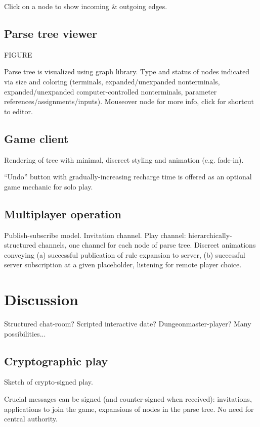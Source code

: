 \documentclass{acm_proc_article-sp}
\begin{document}
Click on a node to show incoming \& outgoing edges.

\subsection{Parse tree viewer}

FIGURE

Parse tree is visualized using graph library.
Type and status of nodes indicated via size and coloring (terminals, expanded/unexpanded nonterminals, expanded/unexpanded computer-controlled nonterminals, parameter references/assignments/inputs).
Mouseover node for more info, click for shortcut to editor.

\subsection{Game client}

Rendering of tree with minimal, discreet styling and animation (e.g. fade-in).

``Undo'' button with gradually-increasing recharge time is offered as an optional game mechanic for solo play.

\subsection{Multiplayer operation}

Publish-subscribe model.
Invitation channel.
Play channel: hierarchically-structured channels, one channel for each node of parse tree.
Discreet animations conveying (a) successful publication of rule expansion to server, (b) successful server subscription at a given placeholder, listening for remote player choice.

\section{Discussion}

Structured chat-room?
Scripted interactive date?
Dungeonmaster-player?
Many possibilities...


\subsection{Cryptographic play}

Sketch of crypto-signed play.

Crucial messages can be signed (and counter-signed when received): invitations, applications to join the game, expansions of nodes in the parse tree.
No need for central authority.
\end{document}

